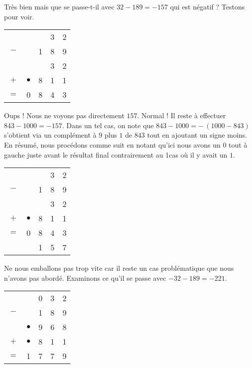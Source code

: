 \smallskip

Très bien mais que se passe-t-il avec $32 - 189 = -157$ qui est négatif ? Testons pour voir.
\begin{center}
\begin{tabular}{ccccc}
	    &  &   & 3 & 2 \\
	$-$ &              & 1 & 8 & 9 \\
	\hline
	\hline
	    &              &   & 3 & 2 \\
	$+$ & $\bullet$    & 8 & 1 & 1 \\
	\hline
    $=$ & 0            & 8 & 4 & 3 \\
\end{tabular}
\end{center}
Oups ! Nous ne voyons pas directement $157$. Normal ! Il reste à effectuer $843 - 1000 = -157$.
Dans un tel cas, on note que $843 - 1000 = - \, (1000 - 843)$ s'obtient via un complément à $9$ plus $1$ de $843$ tout en ajoutant un signe moins.
En résumé, nous procédons comme suit en notant qu'ici nous avons un $0$ tout à gauche juste avant le résultat final contrairement au 1\ier{}cas où il y avait un $1$. 
\begin{center}
\begin{tabular}{ccccc}
	    &           &   & 3 & 2 \\
	$-$ &           & 1 & 8 & 9 \\
	\hline
	\hline
	    &           &   & 3 & 2 \\
	$+$ & $\bullet$ & 8 & 1 & 1 \\
	\hline
    $=$ & 0         & 8 & 4 & 3 \\
	\hline
	\hline
        & \sign{-}  & 1 & 5 & 7 \\
\end{tabular}
\end{center}


\smallskip

Ne nous emballons pas trop vite car il reste un cas problématique que nous n'avons pas abordé.
Examinons ce qu'il se passe avec $-32 - 189 = - 221$.
\begin{center}
\begin{tabular}{ccccc}
	    & \sign{-}  & 0 & 3 & 2 \\
	$-$ &           & 1 & 8 & 9 \\
	\hline
	\hline
	    & $\bullet$ & 9 & 6 & 8 \\
	$+$ & $\bullet$ & 8 & 1 & 1 \\
	\hline
    $=$ & 1         & 7 & 7 & 9 \\
\end{tabular}
\end{center}

